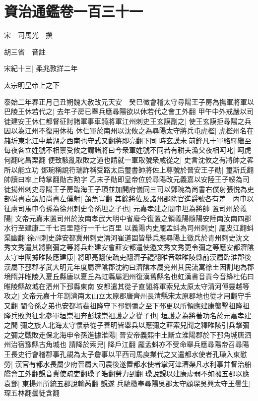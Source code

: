 \chapter{資治通鑑卷一百三十一}
宋　司馬光　撰

胡三省　音註

宋紀十三|{
	柔兆敦牂二年}


太宗明皇帝上之下

泰始二年春正月己丑朔魏大赦改元天安　癸巳徵會稽太守尋陽王子房為撫軍將軍以巴陵王休若代之|{
	去年子房已舉兵應尋陽欲以休若代之會工外翻}
甲午中外戒嚴以司徒建安王休仁都督征討諸軍事車騎將軍江州刺史王玄謨副之|{
	使王玄謨拒尋陽之兵因以為江州不復用休祐}
休仁軍於南州以沈攸之為尋陽太守將兵屯虎檻|{
	虎檻州名在赭圻東北江中蕪湖之西南也守式又翻將即亮翻下同}
時玄謨未前鋒凡十軍絡繹繼至每夜各立姓號不相禀受攸之謂諸將曰今衆軍姓號不同若有耕夫漁父夜相呵叱|{
	呵虎何翻叱昌栗翻}
便致駭亂取敗之道也請就一軍取號衆咸從之|{
	史言沈攸之有將帥之畧所以能立功}
鄧琬稱說符瑞詐稱受路太后璽書帥將佐上尊號於晉安王子勛|{
	璽斯氏翻帥讀曰率上時掌翻勛古勲字}
乙未子勛即皇帝位於尋陽改元義嘉以安陸王子綏為司徒揚州刺史尋陽王子房臨海王子頊並加開府儀同三司以鄧琬為尚書右僕射張悦為吏部尚書袁顗加尚書左僕射|{
	顗魚豈翻}
其餘將佐及諸州郡除官進爵號各有差　丙申以征虜司馬申令孫為徐州刺史令孫坦之子也|{
	元嘉孝建之間申坦為將帥}
置司州於義陽|{
	文帝元嘉末置司州於汝南孝武大明中省廢今復置之領義陽隨陽安陸南汝南四郡水行至建康二千七百里陸行一千七百里}
以義陽内史龎孟蚪為司州刺史|{
	龎皮江翻蚪渠幽翻}
徐州刺史薛安都冀州刺史清河崔道固皆舉兵應尋陽上徵兵於青州刺史沈文秀文秀遣其將劉彌之等將兵赴建安會薛安都遣使邀文秀文秀更令彌之等應安都濟隂太守申闡據睢陵應建康|{
	將即亮翻使疏吏翻濟子禮翻睢音雖睢陵縣前漢屬臨淮郡後漢屬下邳郡孝武大明元年度屬濟隂郡沈約曰濟隂本屬兖州其民流寓徐土因割地為郡境隋并睢陵入夏丘縣唐以夏丘為虹縣屬泗州復漢舊縣名也虹漢書音貢今音絳杜佑曰睢陵縣故城在泗州下邳縣東南}
安都遣其從子直閣將軍索兒太原太守清河傅靈越等攻之|{
	文帝元嘉十年割濟南太山立太原郡唐齊州長清縣宋太原郡地也從才用翻守手又翻}
闡令孫之弟也安都壻裴祖隆守下邳劉彌之至下邳更以所領應建康襲擊祖隆祖隆兵敗與征北參軍垣崇祖奔彭城崇祖護之之從子也|{
	垣護之為將著功名於元嘉孝建之間}
彌之族人北海太守懷恭從子善明皆舉兵以應彌之薛索兒聞之釋睢陵引兵擊彌之彌之戰敗走保北海申令孫進據淮陽|{
	晉安帝義熙中土斷立淮陽郡於下邳角城唐泗州治宿豫縣古角城也}
請降於索兒|{
	降戶江翻}
龎孟蚪亦不受命舉兵應尋陽帝召尋陽王長史行會稽郡事孔覬為太子詹事以平西司馬庾業代之又遣都水使者孔璪入東慰勞|{
	漢官有都水長屬少府晉屬大司農後遂置都水使者掌河津漕渠凡水利事并督治船艦會工外翻覬音冀使疏吏翻璪子皓翻勞力到翻}
璪說覬以建康虚弱不如擁五郡以應袁鄧|{
	東揚州所統五郡說輸芮翻}
覬遂兵馳檄奉尋陽吳郡太守顧琛吳興太守王曇生|{
	琛五林翻曇徒含翻}
